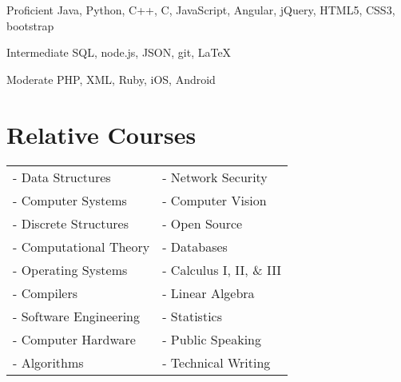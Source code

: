 \documentclass{tccv}
\begin{document}
\begin{factlist}

\item{Proficient}
     {Java, Python, C++, C, JavaScript, Angular, jQuery, HTML5, CSS3, bootstrap}

\item{Intermediate}
     {SQL, node.js, JSON, git, \LaTeX }

\item{Moderate}
     {PHP, XML, Ruby, iOS, Android}

\end{factlist}


\section{Relative Courses}

\begin{tabular}{ l  l }
- Data Structures  	    & - Network Security   \\
- Computer Systems		& - Computer Vision \\
- Discrete Structures  & - Open Source \\
- Computational Theory & - Databases \\
- Operating Systems    & - Calculus I, II, \& III \\
- Compilers 			& - Linear Algebra	 \\
- Software Engineering & - Statistics \\
- Computer Hardware	   &  - Public Speaking\\
- Algorithms			& - Technical Writing \\
\end{tabular}
\end{document}
